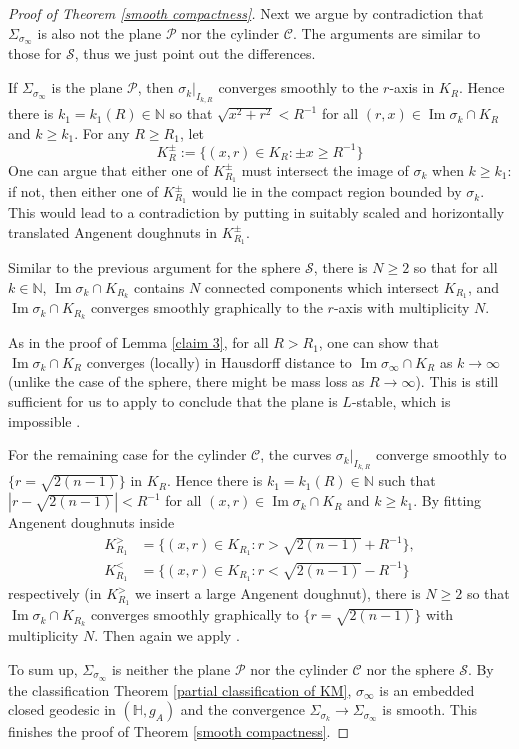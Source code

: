 \documentclass[12pt]{amsart}
\numberwithin{equation}{section}
\theoremstyle{remark}
\begin{document}
\begin{proof} [Proof of Theorem \ref{smooth compactness}]
		Next we argue by contradiction that $\Sigma_{\sigma_\infty}$ is also not the plane $\mathcal P$ nor the cylinder $\mathcal C$. The arguments are similar to those for $\mathcal S$, thus we just point out the differences. 
		
		If $\Sigma_{\sigma_\infty}$ is the plane $\mathcal P$, then $\sigma_k |_{I_{k, R}}$ converges smoothly to the $r$-axis in $K_R$. Hence there is $k_1= k_1(R)\in \mathbb N$ so that $\sqrt{x^2+r^2} < R^{-1}$ for all $(r, x)\in \operatorname{Im} \sigma_k \cap K_{R}$ and $k\ge k_1$. For any $R \ge R_1$, let 
		$$K^\pm_{R} := \{ (x,r) \in K_{R} : \pm x \ge R^{-1}\}$$
		One can argue that either one of $K^\pm_{R_1} $ must intersect the image of $\sigma_k$ when $k\ge k_1$: if not, then either one of $K^\pm_{R_1} $ would lie in the compact region bounded by $\sigma_k$. This would lead to a contradiction by putting in suitably scaled and horizontally translated Angenent doughnuts in $K^\pm_{R_1}$. 
		
		Similar to the previous argument for the sphere $\mathcal S$, there is $N\ge 2$ so that for all $k\in \mathbb N$, $\operatorname{Im} \sigma_k\cap K_{R_k}$ contains $N$ connected components which intersect $K_{R_1}$, and $\operatorname{Im}\sigma_k\cap K_{R_k}$ converges smoothly graphically to the $r$-axis with multiplicity $N$. 
		
		As in the proof of Lemma \ref{claim 3}, for all $R>R_1$, one can show that $\operatorname{Im} \sigma_k \cap K_R$ converges (locally) in Hausdorff distance to $\operatorname{Im} \sigma_\infty\cap K_R$ as $k\to \infty$ (unlike the case of the sphere, there might be mass loss as $R\to \infty$). This is still sufficient for us to apply \cite[Proposition 3.2]{CM2} to conclude that the plane is $L$-stable, which is impossible \cite{CM1}.
		
		For the remaining case for the cylinder $\mathcal C$, the curves $\sigma_k |_{I_{k, R}}$ converge smoothly to $\{r = \sqrt{2(n-1)}\}$ in $K_R$. Hence there is $k_1= k_1(R)\in \mathbb N$ such that $|r- \sqrt{2(n-1)}| < R^{-1}$ for all $(x,r)\in \operatorname{Im} \sigma_k \cap K_{R}$ and $k\ge k_1$. By fitting Angenent doughnuts inside 
		\begin{align*}
			K^>_{R_1} &= \{ (x,r) \in K_{R_1} : r >\sqrt{2(n-1)} +R^{-1}\}, \\
			K^<_{R_1} &= \{ (x,r) \in K_{R_1} : r <\sqrt{2(n-1)} -R^{-1}\}
		\end{align*}
		respectively (in $K^>_{R_1}$ we insert a large Angenent doughnut), there is $N\ge 2$ so that $\operatorname{Im}\sigma_k\cap K_{R_k}$ converges smoothly graphically to $\{ r= \sqrt{2(n-1)}\}$ with multiplicity $N$. Then again we apply \cite[Proposition 3.2]{CM2}.
		
		To sum up, $\Sigma_{\sigma_\infty}$ is neither the plane $\mathcal P$ nor the cylinder $\mathcal C$ nor the sphere $\mathcal S$. By the classification Theorem \ref{partial classification of KM}, $\sigma_\infty$ is an embedded closed geodesic in $(\mathbb H, g_A)$ and the convergence $\Sigma_{\sigma_k} \to \Sigma_{\sigma_\infty}$ is smooth. This finishes the proof of Theorem \ref{smooth compactness}.
	\end{proof}
	
\end{document}
